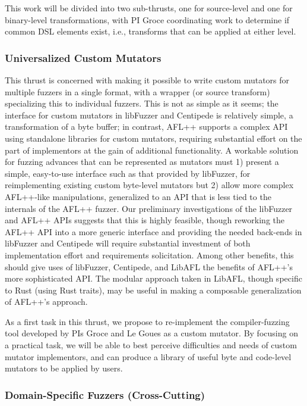 This work will be divided into two sub-thrusts, one for source-level and one 
for binary-level transformations, with PI Groce coordinating work to determine 
if common DSL elements exist, i.e., transforms that can be applied at either 
level.


\subsubsection{Universalized Custom Mutators}

This thrust is concerned with making it possible to write custom mutators for 
multiple fuzzers in a single format, with a wrapper (or source transform) 
specializing this to individual fuzzers.  This is not as simple as it
seems; the interface for custom mutators in libFuzzer and Centipede is
relatively simple, a transformation of a byte buffer; in contrast,
AFL++ supports a complex API using standalone libraries for custom
mutators, requiring substantial effort on the part of implementors at
the gain of additional functionality.  A workable solution for fuzzing
advances that can be represented as mutators must 1) present a simple,
easy-to-use interface such as that provided by libFuzzer, for
reimplementing existing custom byte-level mutators but 2) allow more
complex AFL++-like manipulations, generalized to an API that is less
tied to the internals of the AFL++ fuzzer.  Our preliminary
investigations of the libFuzzer and AFL++ APIs suggests that this is
highly feasible, though reworking the AFL++ API into a more generic
interface and providing the needed back-ends in libFuzzer and
Centipede will require substantial investment of both implementation
effort and requirements solicitation.  Among other benefits, this
should give uses of libFuzzer, Centipede, and LibAFL the benefits of
AFL++'s more sophisticated API. The modular approach taken in LibAFL,
though specific to Rust (using Rust traits), may be useful in making a
composable generalization of AFL++'s approach.

As a first task in this thrust, we propose to re-implement the compiler-fuzzing 
tool developed by PIs Groce and Le Goues as a custom mutator.  By focusing on a 
practical task, we will be able to best perceive difficulties and needs of 
custom mutator implementors, and can produce a library of useful byte and 
code-level mutators to be applied by users.

\subsubsection{Domain-Specific Fuzzers (Cross-Cutting)}

